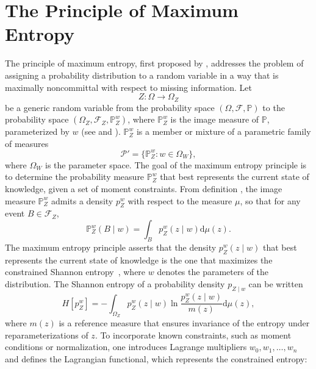 \section{The Principle of Maximum Entropy}
\label{sec:maxent}
The principle of maximum entropy, first proposed by \citet{Jaynes1957}, addresses the problem of assigning a probability distribution to a random variable in a way that is maximally noncommittal with respect to missing information. Let
\begin{equation}
	Z\colon \Omega \to \Omega_Z
\end{equation}
be a generic random variable from the probability space $(\Omega, \mathcal{F}, \mathbb{P})$ to the probability space $(\Omega_Z,\mathcal{F}_Z, \mathbb{P}_{Z}^w)$, where $\mathbb{P}_{Z}^w$ is the image measure of $\mathbb{P}$, parameterized by $w$ (see  and ). $\mathbb{P}_{Z}^w$ is a member or mixture of a parametric family of measures
\begin{equation}
	\mathcal{P}' = \{ \mathbb{P}^w_{Z} \colon w \in \Omega_W\},
\end{equation}
where $\Omega_W$ is the parameter space. The goal of the maximum entropy principle is to determine the probability measure $\mathbb{P}_{Z}^w$ that best represents the current state of knowledge, given a set of moment constraints. From definition , the image measure $\mathbb{P}_{Z}^w$ admits a density $p_{Z}^w$ with respect to the measure $\mu$, so that for any event $B\in \mathcal{F}_Z$,
\begin{equation}
	\mathbb{P}_{Z}^w(B\mid w) = \int_B p_{Z}^w(z\mid w) \mathrm{d}\mu(z).
	\label{eq:max_ent_probability_measure}
\end{equation}
The maximum entropy principle asserts that the density $p_{Z}^w(z \mid w)$ that best represents the current state of knowledge is the one that maximizes the constrained Shannon entropy~\citep{Sivia2006}, where $w$ denotes the parameters of the distribution. The Shannon entropy of a probability density $p_{Z\mid w}$ can be written
\begin{equation}
	H[p^w_{Z}] = - \int_{\Omega_Z} p^w_{Z}(z \mid w) 
	\ln \frac{p_{Z}^w(z \mid w)}{m(z)}  \mathrm{d}\mu(z),
\end{equation}
where $m(z)$ is a reference measure that ensures invariance of the entropy under reparameterizations of $z$. To incorporate known constraints, such as moment conditions or normalization, one introduces Lagrange multipliers $w_0, w_1, \dots, w_n$ and defines the Lagrangian functional, which represents the constrained entropy:
